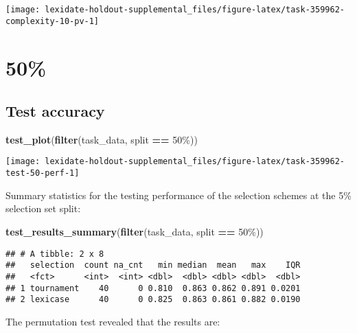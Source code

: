 \documentclass[
]{book}
\newenvironment{Shaded}{\begin{snugshade}}{\end{snugshade}}
\newcommand{\FunctionTok}[1]{\textcolor[rgb]{0.13,0.29,0.53}{\textbf{#1}}}
\newcommand{\NormalTok}[1]{#1}
\newcommand{\SpecialCharTok}[1]{\textcolor[rgb]{0.81,0.36,0.00}{\textbf{#1}}}
\newcommand{\StringTok}[1]{\textcolor[rgb]{0.31,0.60,0.02}{#1}}
\begin{document}
\texttt{[image: lexidate-holdout-supplemental\_files/figure-latex/task-359962-complexity-10-pv-1]}

\hypertarget{section-57}{%
\section{50\%}\label{section-57}}

\hypertarget{test-accuracy-57}{%
\subsection{Test accuracy}\label{test-accuracy-57}}

\begin{Shaded}
\begin{Highlighting}[]
\FunctionTok{test\_plot}\NormalTok{(}\FunctionTok{filter}\NormalTok{(task\_data, split }\SpecialCharTok{==} \StringTok{\textquotesingle{}50\%\textquotesingle{}}\NormalTok{))}
\end{Highlighting}
\end{Shaded}

\texttt{[image: lexidate-holdout-supplemental\_files/figure-latex/task-359962-test-50-perf-1]}

Summary statistics for the testing performance of the selection schemes at the 5\% selection set split:

\begin{Shaded}
\begin{Highlighting}[]
\FunctionTok{test\_results\_summary}\NormalTok{(}\FunctionTok{filter}\NormalTok{(task\_data, split }\SpecialCharTok{==} \StringTok{\textquotesingle{}50\%\textquotesingle{}}\NormalTok{))}
\end{Highlighting}
\end{Shaded}

\begin{verbatim}
## # A tibble: 2 x 8
##   selection  count na_cnt   min median  mean   max    IQR
##   <fct>      <int>  <int> <dbl>  <dbl> <dbl> <dbl>  <dbl>
## 1 tournament    40      0 0.810  0.863 0.862 0.891 0.0201
## 2 lexicase      40      0 0.825  0.863 0.861 0.882 0.0190
\end{verbatim}

The permutation test revealed that the results are:
\end{document}
